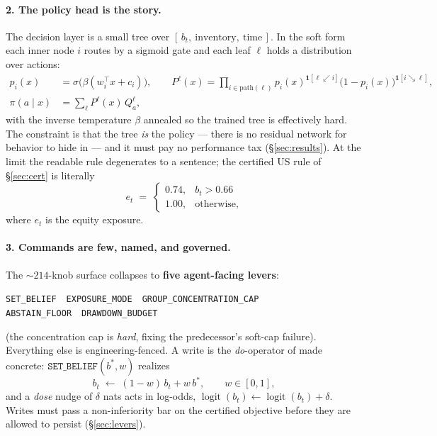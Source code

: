 \documentclass[11pt]{article}
\newcommand{\ind}{\mathbf{1}}
\begin{document}
\paragraph{2. The policy head is the story.} The decision layer is a small tree over
$[\,b_t,\ \text{inventory},\ \text{time}\,]$. In the soft form \citep{frosst2017} each inner
node $i$ routes by a sigmoid gate and each leaf $\ell$ holds a distribution over actions:
\begin{align}
p_i(x) &= \sigma\!\big(\beta(w_i^{\top}x + c_i)\big), \qquad
P^{\ell}(x) = \prod_{i \in \text{path}(\ell)} p_i(x)^{\ind[\ell \swarrow i]}
\big(1-p_i(x)\big)^{\ind[i \searrow \ell]},
\label{eq:tree}\\
\pi(a\mid x) &= \sum_{\ell} P^{\ell}(x)\, Q^{\ell}_a ,\nonumber
\end{align}
with the inverse temperature $\beta$ annealed so the trained tree is effectively hard. The
constraint is that the tree \emph{is} the policy --- there is no residual network for behavior
to hide in --- and it must pay no performance tax (\S\ref{sec:results}). At the limit the
readable rule degenerates to a sentence; the certified US rule of \S\ref{sec:cert} is literally
\begin{equation}
e_t \;=\; \begin{cases} 0.74, & b_t > 0.66\\[2pt] 1.00, & \text{otherwise,}\end{cases}
\label{eq:rule}
\end{equation}
where $e_t$ is the equity exposure.

\paragraph{3. Commands are few, named, and governed.} The ${\sim}214$-knob surface collapses to
\textbf{five agent-facing levers}:
\begin{center}\small
\texttt{SET\_BELIEF} \,\textperiodcentered\, \texttt{EXPOSURE\_MODE} \,\textperiodcentered\,
\texttt{GROUP\_CONCENTRATION\_CAP}\\
\texttt{ABSTAIN\_FLOOR} \,\textperiodcentered\, \texttt{DRAWDOWN\_BUDGET}
\end{center}
(the concentration cap is \emph{hard}, fixing the predecessor's soft-cap failure). Everything
else is engineering-fenced. A write is the \emph{do}-operator of \citet{pearl2009} made
concrete: $\texttt{SET\_BELIEF}(b^{*}, w)$ realizes
\begin{equation}
b_t \;\leftarrow\; (1-w)\, b_t + w\, b^{*}, \qquad w \in [0,1],
\label{eq:write}
\end{equation}
and a \emph{dose} nudge of $\delta$ nats acts in log-odds,
$\operatorname{logit}(b_t) \leftarrow \operatorname{logit}(b_t) + \delta$. Writes must pass a
non-inferiority bar on the certified objective before they are allowed to persist
(\S\ref{sec:levers}).
\end{document}
